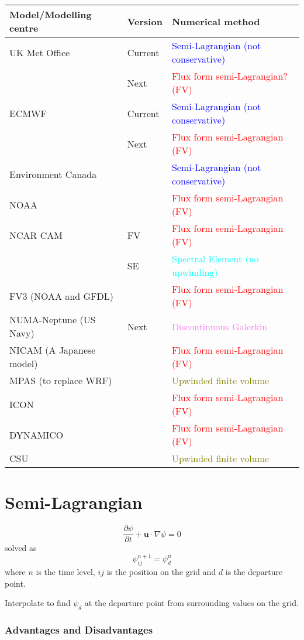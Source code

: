 \begin{tabular}{lll}
\textbf{Model/Modelling centre} & \textbf{Version} & \textbf{Numerical method}\tabularnewline
\hline 
UK Met Office & Current & \textcolor{blue}{Semi-Lagrangian (not conservative)}\tabularnewline
 & Next & \textcolor{red}{Flux form semi-Lagrangian? (FV)}\tabularnewline
\hline 
ECMWF & Current & \textcolor{blue}{Semi-Lagrangian (not conservative)}\tabularnewline
 & Next & \textcolor{red}{Flux form semi-Lagrangian (FV)}\tabularnewline
\hline 
Environment Canada &  & \textcolor{blue}{Semi-Lagrangian (not conservative)}\tabularnewline
\hline 
NOAA &  & \textcolor{red}{Flux form semi-Lagrangian (FV)}\tabularnewline
\hline 
NCAR CAM & FV & \textcolor{red}{Flux form semi-Lagrangian (FV)}\tabularnewline
 & SE & \textcolor{cyan}{Spectral Element (no upwinding)}\tabularnewline
\hline 
FV3 (NOAA and GFDL) &  & \textcolor{red}{Flux form semi-Lagrangian (FV)}\tabularnewline
\hline 
NUMA-Neptune (US Navy) & Next & \textcolor{violet}{Discontinuous Galerkin}\tabularnewline
\hline 
NICAM (A Japanese model) &  & \textcolor{red}{Flux form semi-Lagrangian (FV)}\tabularnewline
\hline 
MPAS (to replace WRF) &  & \textcolor{olive}{Upwinded finite volume}\tabularnewline
\hline 
ICON &  & \textcolor{red}{Flux form semi-Lagrangian (FV)}\tabularnewline
\hline 
DYNAMICO &  & \textcolor{red}{Flux form semi-Lagrangian (FV)}\tabularnewline
\hline 
CSU &  & \textcolor{olive}{Upwinded finite volume}\tabularnewline
\end{tabular}

\clearpage{}

\section*{Semi-Lagrangian}

\begin{minipage}[t]{0.6\columnwidth}%
\[
\frac{\partial\psi}{\partial t}+\mathbf{u}\cdot\nabla\psi=0
\]
solved as
\[
\psi_{ij}^{n+1}=\psi_{d}^{n}
\]
where $n$ is the time level, $ij$ is the position on the grid and
$d$ is the departure point. 

Interpolate to find $\psi_{d}$ at the departure point from surrounding
values on the grid.%
\end{minipage} %
\begin{minipage}[t]{0.38\columnwidth}%
\phantom{}\resizebox{1\textwidth}{!}{}%
\end{minipage}

\subsubsection*{Advantages and Disadvantages}
\begin{description}
\item [{\smiley{}}] 
\item [{\smiley{}}] 
\item [{\frownie{}}] 
\end{description}
\clearpage{}

